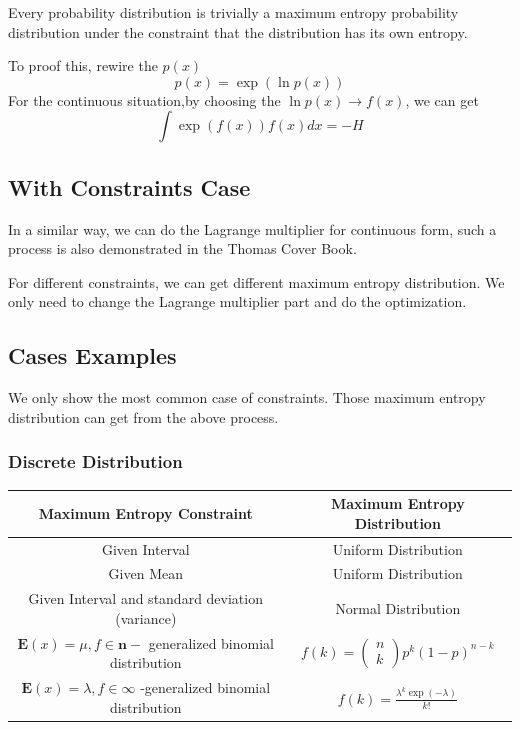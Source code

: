 \documentclass[12pt, a4paper]{article}
\begin{document}
Every probability distribution is trivially a maximum entropy probability distribution under the constraint that the distribution has its own entropy. 

To proof this, rewire the $p(x)$
\begin{equation}
p(x)=\exp {(\ln {p(x)})}
\end{equation}
For the continuous situation,by choosing the $\ln {p(x)}\rightarrow f(x)$, we can get
\begin{equation}
\int \exp {(f(x))}f(x)dx=-H
\end{equation}


\subsection{With Constraints Case}
In a similar way, we can do the Lagrange multiplier for continuous form, such a process is also demonstrated in the Thomas Cover Book.

For different constraints, we can get different maximum entropy distribution. We only need to change the Lagrange multiplier part and do the optimization.




\subsection{Cases Examples}
We only show the most common case of constraints. Those maximum entropy distribution can get from the above process.


\subsubsection{Discrete Distribution}
\begin{table}[H]
\centering
\begin{tabular}{|c|c|}
\hline
Maximum Entropy Constraint & Maximum Entropy Distribution\\
\hline
Given Interval & Uniform Distribution\\
Given Mean & Uniform Distribution\\
Given Interval and standard deviation (variance) & Normal Distribution\\
$\mathbf{E}(x)=\mu, f \in \mathbf{n}-$ generalized binomial distribution&$f(k)=\left(\begin{array}{l}n \\ k\end{array}\right) p^{k}(1-p)^{n-k}$\\

$\mathbf{E}(x)=\lambda, f \in \infty$ -generalized binomial distribution& $f(k)=\frac{\lambda^{k} \exp (-\lambda)}{k !}
$\\




\hline
\end{tabular}
\end{table}
\end{document}
